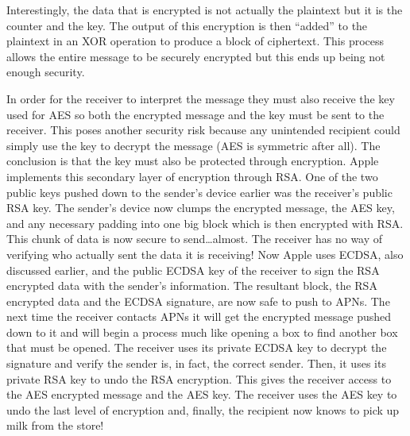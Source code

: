     Interestingly, the data that is encrypted is not actually the plaintext but it is the counter and the key.  The output of this encryption is then ``added'' to the plaintext in an XOR operation to produce a block of ciphertext.  This process allows the entire message to be securely encrypted but this ends up being not enough security.

    In order for the receiver to interpret the message they must also receive the key used for AES so both the encrypted message and the key must be sent to the receiver.  This poses another security risk because any unintended recipient could simply use the key to decrypt the message (AES is symmetric after all).  The conclusion is that the key must also be protected through encryption.  Apple implements this secondary layer of encryption through RSA.  One of the two public keys pushed down to the sender's device earlier was the receiver's public RSA key.  The sender's device now clumps the encrypted message, the AES key, and any necessary padding into one big block which is then encrypted with RSA.  This chunk of data is now secure to send\ldots almost.  The receiver has no way of verifying who actually sent the data it is receiving!  Now Apple uses ECDSA, also discussed earlier, and the public ECDSA key of the receiver to sign the RSA encrypted data with the sender's information.  The resultant block, the RSA encrypted data and the ECDSA signature, are now safe to push to APNs.  The next time the receiver contacts APNs it will get the encrypted message pushed down to it and will begin a process much like opening a box to find another box that must be opened.  The receiver uses its private ECDSA key to decrypt the signature and verify the sender is, in fact, the correct sender.  Then, it uses its private RSA key to undo the RSA encryption.  This gives the receiver access to the AES encrypted message and the AES key.  The receiver uses the AES key to undo the last level of encryption and, finally, the recipient now knows to pick up milk from the store!
